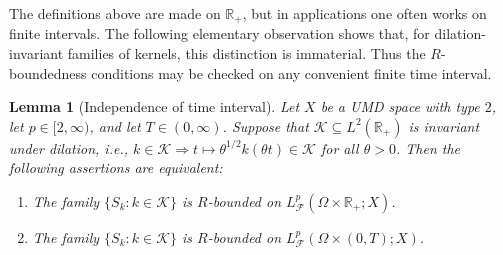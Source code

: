 \documentclass{amsart}
\theoremstyle{plain}
\theoremstyle{remark}
\theoremstyle{plain}
\newtheorem{lemma}[theorem]{Lemma}
\numberwithin{equation}{section}
\newcommand{\R}{\mathbb R}
\newcommand{\1}{\mathbf 1}
\begin{document}
The definitions above are made on $\mathbb R_+$, but in applications one
often works on finite intervals. The following elementary observation shows
that, for dilation-invariant families of kernels, this distinction is
immaterial. Thus the $R$-boundedness conditions may be checked on any
convenient finite time interval.

\begin{lemma}[Independence of time interval]\label{lemma:timeintervalSp}
Let $X$ be a UMD space with type $2$, let
$p\in[2,\infty)$, and let $T\in (0,\infty)$. Suppose that $\mathcal{K}\subseteq L^2(\R_+)$ is invariant under dilation, i.e., $k\in \mathcal{K} \Rightarrow t\mapsto \theta^{1/2} k(\theta t)\in \mathcal{K}$ for all $\theta>0$. Then the following assertions are equivalent:
\begin{enumerate}[label={\rm(\arabic*)}, leftmargin=*]
\item The family $\{S_k:k\in \mathcal{K}\}$ is $R$-bounded on $L^p_{\mathscr F}(\Omega\times\mathbb R_+;X)$.
\item The family $\{S_k:k\in \mathcal{K}\}$ is $R$-bounded on $L^p_{\mathscr F}(\Omega\times(0,T);X)$.
\end{enumerate}
\end{lemma}
\end{document}
